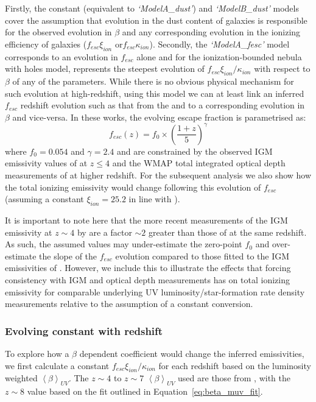 Firstly, the constant (equivalent to \emph{`ModelA\_dust'}) and \emph{`ModelB\_dust'} models cover the assumption that evolution in the dust content of galaxies is responsible for the observed evolution in $\beta$ and any corresponding evolution in the ionizing efficiency of galaxies ($f_{esc}\xi_{ion}$ or$f_{esc}\kappa_{ion}$). Secondly, the \emph{`ModelA\_fesc'} model corresponds to an evolution in $f_{esc}$ alone and for the ionization-bounded nebula with holes model, represents the steepest evolution of $f_{esc}\xi_{ion}/\kappa_{ion}$ with respect to $\beta$ of any of the parameters. While there is no obvious physical mechanism for such evolution at high-redshift, using this model we can at least link an inferred $f_{esc}$ redshift evolution such as that from the \citet{Kuhlen:2012ka} and \citet{Robertson:2013ji} to a corresponding evolution in $\beta$ and vice-versa. In these works, the evolving escape fraction is parametrised as:
\begin{equation}
f_{esc}(z) = f_{0} \times \left ( \frac{1 + z}{5} \right )^{\gamma }
\end{equation}
where $f_{0} = 0.054$ and $\gamma = 2.4$ \citep{Robertson:2013ji} and are constrained by the observed IGM emissivity values of \citet{FaucherGiguere:2008jc} at $z \leq 4$ and the WMAP total integrated optical depth measurements of \citet{Hinshaw:2013dd} at higher redshift. For the subsequent analysis we also show how the total ionizing emissivity would change following this evolution of $f_{esc}$ (assuming a constant $\xi_{ion} = 25.2$ in line with \citet{Robertson:2013ji}).

It is important to note here that the more recent measurements of the IGM emissivity at $z\sim4$ by \citet{Becker:2013hc} are a factor $\sim 2$ greater than those of \citet{FaucherGiguere:2008jc} at the same redshift. As such, the assumed values may under-estimate the zero-point $f_{0}$ and over-estimate the slope of the $f_{esc}$ evolution compared to those fitted to the IGM emissivities of \citet{Becker:2013hc}. However, we include this to illustrate the effects that forcing consistency with IGM and optical depth measurements has on total ionizing emissivity for comparable underlying UV luminosity/star-formation rate density measurements relative to the assumption of a constant conversion.

\subsubsection{Evolving constant with redshift}
To explore how a $\beta$ dependent coefficient would change the inferred emissivities, we first calculate a constant $f_{esc}\xi_{ion}/\kappa_{ion}$ for each redshift based on the luminosity weighted $\left \langle \beta  \right \rangle_{UV}$. The $z\sim4$ to $z\sim7$ $\left \langle \beta  \right \rangle_{UV}$ used are those from \citet{Bouwens:2013vf}, with the $z\sim8$ value based on the fit outlined in Equation~\ref{eq:beta_muv_fit}. 

